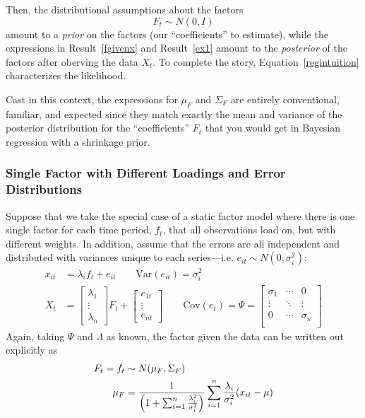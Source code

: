 \documentclass[12pt]{article}
\theoremstyle{plain}
\theoremstyle{definition}
\theoremstyle{remark}
\begin{document}
Then, the distributional assumptions about the factors
\[
  F_t \sim N(0, I)
\]
amount to a \emph{prior} on the factors (our ``coefficients'' to
estimate), while the expressions in Result~\ref{fgivenx} and
Result~\ref{ex1} amount to the \emph{posterior} of the factors after
oberving the data $X_t$. To complete the story,
Equation~\ref{regintuition} characterizes the likelihood.

Cast in this context, the expressions for $\mu_F$ and $\Sigma_F$ are
entirely conventional, familiar, and expected since they match exactly
the mean and variance of the posterior distribution for the
``coefficients'' $F_t$ that you would get in Bayesian regression with a
shrinkage prior.


\subsubsection{Single Factor with Different Loadings and Error
Distributions}

Suppose that we take the special case of a static factor model where
there is one single factor for each time period, $f_t$, that all
observations load on, but with different weights. In addition, assume
that the errors are all independent and distributed with variances
unique to each series---i.e. $e_{it}\sim N(0, \sigma_i^2)$:
\begin{align*}
  x_{it} &= \lambda_i f_{t} + e_{it}\qquad \text{Var}(e_{it})=\sigma_i^2\\
  X_t &= \begin{bmatrix} \lambda_1 \\ \vdots \\ \lambda_n \end{bmatrix}
    F_t +
    \begin{bmatrix} e_{1t} \\ \vdots \\ e_{nt} \end{bmatrix}
    \qquad \text{Cov}(e_t) = \Psi =
    \begin{bmatrix}
      \sigma_1 & \cdots & 0 \\
      \vdots & \ddots & \vdots \\
      0 & \cdots & \sigma_n \\
    \end{bmatrix}
\end{align*}
Again, taking $\Psi$ and $\Lambda$ as known, the factor given the data
can be written out explicitly as
\begin{align}
  F_t = f_t &\sim N(\mu_F, \Sigma_F)\label{ex2}\\
  \mu_F &=
  \frac{1}{\left(1+\sum^n_{i=1}\frac{\lambda_i^2}{\sigma_i^2}\right)}
  \sum^n_{i=1} \frac{\lambda_i}{\sigma_i^2}(x_{it}-\mu) \notag\\
\end{align}
\end{document}
